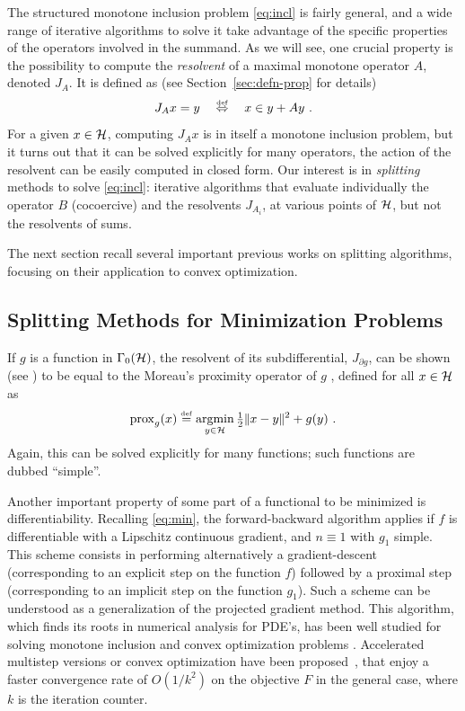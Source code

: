 The structured monotone inclusion problem \eqref{eq:incl} is fairly general, and a wide range of iterative algorithms to solve it take advantage of the specific properties of the operators involved in the summand. As we will see, one crucial property is the possibility to compute the \textit{resolvent} of a maximal monotone operator $A$, denoted $J_A$. It is defined as (see Section~\ref{sec:defn-prop} for details)
%
\[ J_A x = y \quad \stackrel{\mathrm{\scriptscriptstyle{def}}}{\Leftrightarrow} \quad x \in y + A y~. \]
%
For a given $x \in \mathcal{H}$, computing $J_A x$ is in itself a monotone inclusion problem, but it turns out that it can be solved explicitly for many operators, \eg the action of the resolvent can be easily computed in closed form. Our interest is in \textit{splitting} methods to solve \eqref{eq:incl}: iterative algorithms that evaluate individually the operator $B$ (cocoercive) and the resolvents $J_{A_i}$, at various points of $\mathcal{H}$, but not the resolvents of sums.

The next section recall several important previous works on splitting algorithms, focusing on their application to convex optimization.

\subsection{Splitting Methods for Minimization Problems}

If $g$ is a function in $\Gamma_0(\mathcal{H})$, the resolvent of its subdifferential, $J_{\partial g}$, can be shown (see ) to be equal to the Moreau's proximity operator of $g$ \cite{Moreau65}, defined for all $x \in \mathcal{H}$ as
%
\[
	 \operatorname{prox}_{g}(x) \stackrel{\mathrm{\scriptscriptstyle{def}}}{=} \underset{y \in \mathcal{H}}{\operatorname{argmin}} \, {\textstyle \frac{1}{2}} |\kern-1pt| x - y |\kern-1pt|^2 + g(y)~.
\]
% 
Again, this can be solved explicitly for many functions; such functions are dubbed ``simple''.

Another important property of some part of a functional to be minimized is differentiability. Recalling \eqref{eq:min}, the forward-backward algorithm applies if $f$ is differentiable with a Lipschitz continuous gradient, and ${n \equiv 1}$ with $g_1$ simple. This scheme consists in performing alternatively a gradient-descent (corresponding to an explicit step on the function $f$) followed by a proximal step (corresponding to an implicit step on the function $g_1$). Such a scheme can be understood as a generalization of the projected gradient method. This algorithm, which finds its roots in numerical analysis for PDE's, has been well studied for solving monotone inclusion and convex optimization problems \cite{Bredies08,ChenRockafellar97,CombettesWajs05,Gabay83,Mercier79,Passty79,Tseng91,Tseng00}. Accelerated multistep versions or convex optimization have been proposed~\cite{BeckTeboulle09,Nesterov07,Tseng08}, that enjoy a faster convergence rate of $O(1/k^2)$ on the objective $F$ in the general case, where $k$ is the iteration counter.

